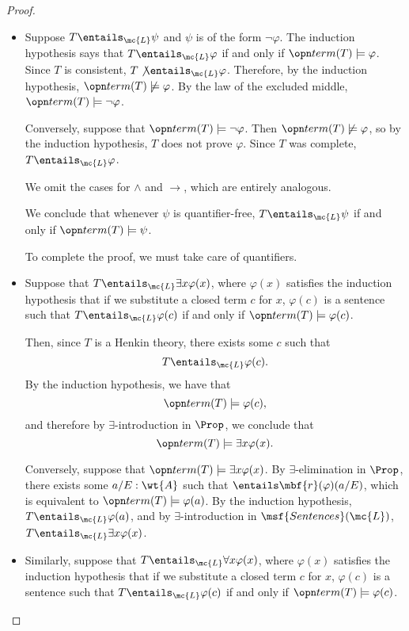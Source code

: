 \documentclass[11pt]{article}
\begin{document}
\begin{proof}
\begin{itemize}
\item Suppose $T \entails_{\mc{L}} \psi$ and $\psi$ is of the form $\neg \varphi$. The induction hypothesis says that $T \entails_{\mc{L}} \varphi$ if and only if $\term(T) \models \varphi$. Since $T$ is consistent, $T \not \entails_{\mc{L}} \varphi$. Therefore, by the induction hypothesis, $\term(T) \not \models \varphi$. By the law of the excluded middle, $\term(T) \models \neg \varphi$.

 Conversely, suppose that $\term(T) \models \neg \varphi$. Then $\term(T) \not \models \varphi$, so by the induction hypothesis, $T$ does not prove $\varphi$. Since $T$ was complete, $T \entails_{\mc{L}} \varphi$.

We omit the cases for $\wedge$ and $\rightarrow$, which are entirely analogous.

We conclude that whenever $\psi$ is quantifier-free, $T \entails_{\mc{L}} \psi$ if and only if $\term(T) \models \psi$.

To complete the proof, we must take care of quantifiers.

\item Suppose that $T \entails_{\mc{L}} \exists x \varphi(x)$, where $\varphi(x)$ satisfies the induction hypothesis that if we substitute a closed term $c$ for $x$, $\varphi(c)$ is a sentence such that $T \entails_{\mc{L}} \varphi(c)$ if and only if $\term(T) \models \varphi(c)$.

  Then, since $T$ is a Henkin theory, there exists some $c$ such that
  $$
T \entails_{\mc{L}} \varphi(c).
$$
By the induction hypothesis, we have that
$$
\term(T) \models \varphi(c),
$$
and therefore by $\exists$-introduction in $\Prop$, we conclude that
$$
\term(T) \models \exists x \varphi(x).
$$

Conversely, suppose that $\term(T) \models \exists x \varphi(x)$. By $\exists$-elimination in $\Prop$, there exists some $a/E : \wt{A}$ such that $\entails \mbf{r}(\varphi)(a/E)$, which is equivalent to $\term(T) \models \varphi(a)$. By the induction hypothesis, $T \entails_{\mc{L}} \varphi(a)$, and by $\exists$-introduction in $\msf{Sentences}(\mc{L})$, $T \entails_{\mc{L}} \exists x \varphi(x)$.

\item Similarly, suppose that $T \entails_{\mc{L}} \forall x \varphi(x)$, where $\varphi(x)$ satisfies the induction hypothesis that if we substitute a closed term $c$ for $x$, $\varphi(c)$ is a sentence such that $T \entails_{\mc{L}} \varphi(c)$ if and only if $\term(T) \models \varphi(c)$.


\end{itemize}
\end{proof}
\end{document}
